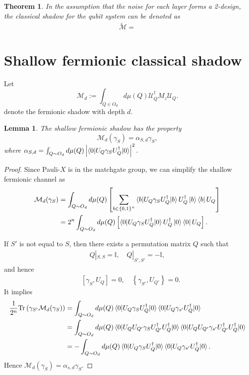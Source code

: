 \documentclass{article}
\newcommand{\abs}[1]{\left| #1 \right|}
\newcommand{\cbra}[1]{\left\{ #1 \right\}}
\newcommand{\sbra}[1]{\left[ #1 \right]}
\newcommand{\tr}[1]{\text{Tr}\left( #1 \right)}
\newtheorem{theorem}{Theorem}
\newtheorem{lemma}{Lemma}
\newcommand{\Ucal}{\mathcal{U}}
\newcommand{\Mcal}{\mathcal{M}}
\newcommand{\Ibb}{\mathbb{I}}
\begin{document}
\begin{theorem}
In the assumption that the noise for each layer forms a 2-design, the classical shadow for the qubit system can be denoted as
\begin{align}
\widetilde{\Mcal} = 
\end{align}
\end{theorem}


\section{Shallow fermionic classical shadow}

Let
\begin{equation}
\Mcal_d := \int_{Q\in O_d} d\mu(Q) \Ucal_Q^{\dagger} M_z \Ucal_Q. 
\end{equation}
denote the fermionic shadow with depth $d$.

\begin{lemma}
The shallow fermionic shadow has the property
\begin{equation}
\Mcal_d(\gamma_S) = \alpha_{S,d} \gamma_S,
\end{equation}
where 
$\alpha_{S,d} = \int_{Q\sim O_d} d\mu(Q) \abs{\braket{0|U_Q \gamma_S U_{Q}^\dagger|0}}^2.$
\end{lemma}

\begin{proof}
Since Pauli-$X$ is in the matchgate group, we can simplify the shallow fermionic channel as
\begin{align}
\Mcal_d(\gamma_S) &= \int_{Q\sim O_d} d\mu(Q)\sbra{\sum_{b\in\cbra{0,1}^n}\braket{b|U_Q\gamma_S U_Q^\dagger |b} U_Q^\dagger \ket{b}\bra{b}U_Q}\\
&= 2^n\int_{Q\sim O_d} d\mu(Q)\sbra{\braket{0|U_Q\gamma_S U_Q^\dagger |0} U_Q^\dagger \ket{0}\bra{0}U_Q}.
\end{align}

If $S'$ is not equal to $ S$, 
then there exists a permutation matrix $Q$ such that
\begin{align}
Q|_{S,S} = \Ibb, \quad Q|_{S',S'} = -\Ibb,
\end{align}
and hence
\begin{align}
\quad [\gamma_{S}, U_{Q}] = 0, \quad \cbra{\gamma_{S'}, U_{Q'}} = 0. 
\end{align}
It implies
\begin{align}
\frac{1}{2^n}\tr{\gamma_{S'} \Mcal_d(\gamma_S)} &= 
\int_{Q\sim O_d} d\mu(Q) \braket{0|U_Q \gamma_S U_{Q}^\dagger|0}\braket{0|U_Q \gamma_{s'} U_{Q}^\dagger|0}\\
&=\int_{Q\sim O_d} d\mu(Q) \braket{0|U_Q U_{Q'}\gamma_S U_{Q'}^\dagger U_{Q}^\dagger|0}\braket{0|U_Q U_{Q'}\gamma_{s'} U_{Q'}^\dagger U_{Q}^\dagger|0}\\
&= -\int_{Q\sim O_d} d\mu(Q) \braket{0|U_Q \gamma_S U_{Q}^\dagger|0}\braket{0|U_Q \gamma_{s'} U_{Q}^\dagger|0}.
\end{align}
Hence $\Mcal_d (\gamma_S) = \alpha_{s,d} \gamma_S$.
\end{proof}
\end{document}

